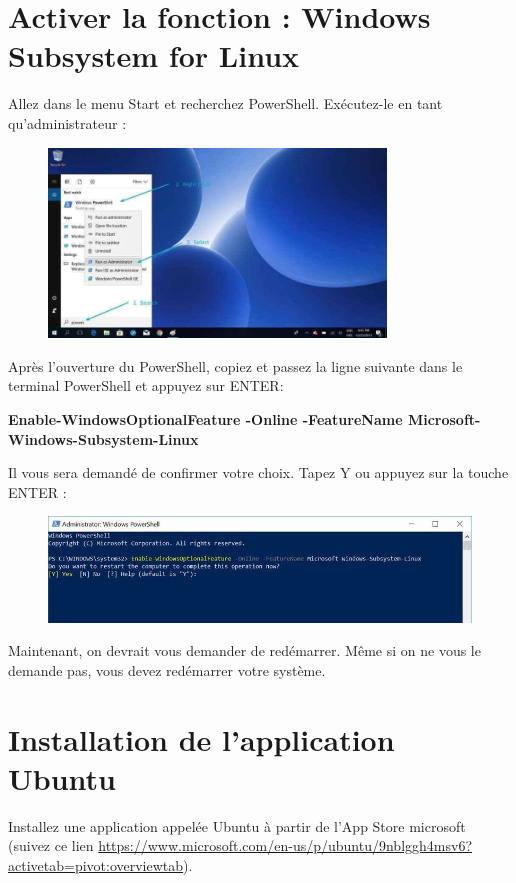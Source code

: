 \documentclass{article}
\begin{document}
\section{Activer la fonction : Windows Subsystem for Linux}
Allez dans le menu Start et recherchez PowerShell. Exécutez-le en tant qu'administrateur :
\begin{figure}[H]
\center
\includegraphics[width=0.8\textwidth]{Plots/Powershell-Ubuntu-install.jpg}
\end{figure}
Après l'ouverture du PowerShell, copiez et passez la ligne suivante dans le terminal PowerShell et appuyez sur ENTER:

\begin{tcolorbox}[width=\textwidth,colback={purple},title={PowerShell terminal},outer arc=0mm,colupper=white]    
    \large\textbf{ Enable-WindowsOptionalFeature -Online -FeatureName Microsoft-Windows-Subsystem-Linux }
\end{tcolorbox}
Il vous sera demandé de confirmer votre choix. Tapez Y ou appuyez sur la touche ENTER :
\begin{figure}[H]
\includegraphics[width=1\textwidth]{Plots/Powershell-Ubuntu-install-2.jpg}
\end{figure}

Maintenant, on devrait vous demander de redémarrer. Même si on ne vous le demande pas, vous devez redémarrer votre système.

\section{Installation de l'application Ubuntu}
Installez une application appelée Ubuntu à partir de l'App Store microsoft (suivez ce lien \href{https://www.microsoft.com/en-us/p/ubuntu/9nblggh4msv6?activetab=pivot:overviewtab}{https://www.microsoft.com/en-us/p/ubuntu/9nblggh4msv6?activetab=pivot:overviewtab}).
\end{document}
